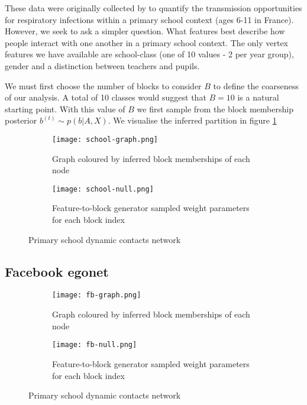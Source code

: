 These data were originally collected by \citet{schools} to quantify the transmission opportunities for respiratory infections within a primary school context (ages 6-11 in France). However, we seek to ask a simpler question. What features best describe how people interact with one another in a primary school context. The only vertex features we have available are school-class (one of 10 values - 2 per year group), gender and a distinction between teachers and pupils.

We must first choose the number of blocks to consider $B$ to define the coarseness of our analysis. A total of 10 classes would suggest that $B=10$ is a natural starting point. With this value of $B$ we first sample from the block membership posterior $b^{(t)} \sim p(b | A, X)$. We visualise the inferred partition in figure \ref{fig:school-graph}

\begin{figure}[!h]
	\centering
	\begin{subfigure}{0.45\linewidth}
		\centering
		\texttt{[image: school-graph.png]}
		\caption{Graph coloured by inferred block memberships of each node}
		\label{fig:school-graph}
	\end{subfigure}
	\hfill
	\begin{subfigure}{0.45\linewidth}
		\centering
		\texttt{[image: school-null.png]}
		\caption{Feature-to-block generator sampled weight parameters for each block index}
		\label{fig:school-null}
	\end{subfigure}
	\caption{Primary school dynamic contacts network}
\end{figure}


\subsection{Facebook egonet}

\begin{figure}[!h]
	\centering
	\begin{subfigure}{0.45\linewidth}
		\centering
		\texttt{[image: fb-graph.png]}
		\caption{Graph coloured by inferred block memberships of each node}
		\label{fig:fb-graph}
	\end{subfigure}
	\hfill
	\begin{subfigure}{0.45\linewidth}
		\centering
		\texttt{[image: fb-null.png]}
		\caption{Feature-to-block generator sampled weight parameters for each block index}
		\label{fig:fb-null}
	\end{subfigure}
	\caption{Primary school dynamic contacts network}
\end{figure}


